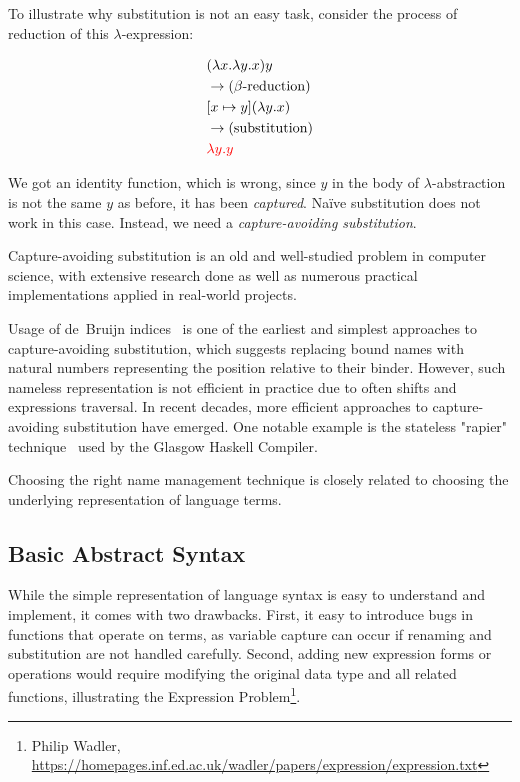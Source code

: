 To illustrate why substitution is not an easy task, consider the process of reduction of this $\lambda$-expression:

\vspace{-1cm}
\begin{align*}
  & (\lambda x. \lambda y. x) y \\
  & \rightarrow \text{($\beta$-reduction)} \\
  & [x \mapsto y](\lambda y. x) \\
  & \rightarrow \text{(substitution)} \\
  & \textcolor{red}{\lambda y. y}
\end{align*}

We got an identity function, which is wrong, since $y$ in the body of $\lambda$-abstraction is not the same $y$ as before, it has been \textit{captured}. Naïve substitution does not work in this case. Instead, we need a \textit{capture-avoiding substitution}.

Capture-avoiding substitution is an old and well-studied problem in computer science, with extensive research done as well as numerous practical implementations applied in real-world projects.

Usage of de~Bruijn indices~\cite{deBruijn1972} is one of the earliest and simplest approaches to capture-avoiding substitution, which suggests replacing bound names with natural numbers representing the position relative to their binder. However, such nameless representation is not efficient in practice due to often shifts and expressions traversal. In recent decades, more efficient approaches to capture-avoiding substitution have emerged. One notable example is the stateless "rapier" technique~\cite{Simon2002_SecretsGHC} used by the Glasgow Haskell Compiler.

Choosing the right name management technique is closely related to choosing the underlying representation of language terms.

\subsection{Basic Abstract Syntax}

While the simple representation of language syntax is easy to understand and implement, it comes with two drawbacks. First, it easy to introduce bugs in functions that operate on terms, as variable capture can occur if renaming and substitution are not handled carefully. Second, adding new expression forms or operations would require modifying the original data type and all related functions, illustrating the Expression Problem\footnote{Philip Wadler, \url{https://homepages.inf.ed.ac.uk/wadler/papers/expression/expression.txt}}.

